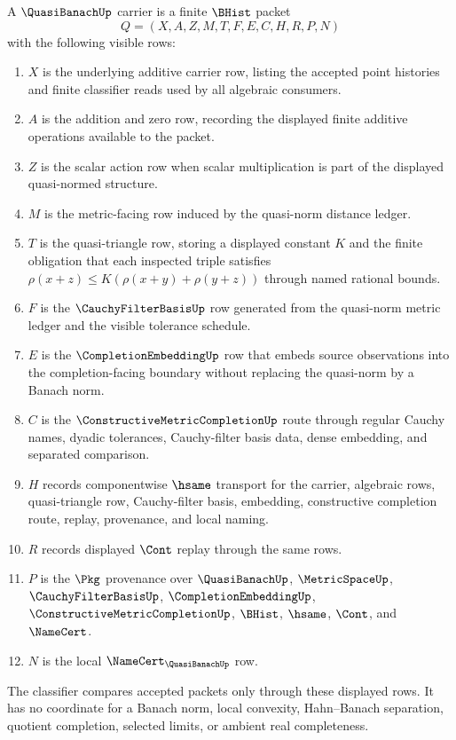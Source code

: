 \begin{definition}
\label{def:quasi-banach-carrier}
A $\QuasiBanachUp$ carrier is a finite $\BHist$ packet
$$
Q=(X,A,Z,M,T,F,E,C,H,R,P,N)
$$
with the following visible rows:
\begin{enumerate}
\item $X$ is the underlying additive carrier row, listing the accepted point histories and finite classifier reads used by all algebraic consumers.
\item $A$ is the addition and zero row, recording the displayed finite additive operations available to the packet.
\item $Z$ is the scalar action row when scalar multiplication is part of the displayed quasi-normed structure.
\item $M$ is the metric-facing row induced by the quasi-norm distance ledger.
\item $T$ is the quasi-triangle row, storing a displayed constant $K$ and the finite obligation that each inspected triple satisfies $\rho(x+z)\leq K(\rho(x+y)+\rho(y+z))$ through named rational bounds.
\item $F$ is the $\CauchyFilterBasisUp$ row generated from the quasi-norm metric ledger and the visible tolerance schedule.
\item $E$ is the $\CompletionEmbeddingUp$ row that embeds source observations into the completion-facing boundary without replacing the quasi-norm by a Banach norm.
\item $C$ is the $\ConstructiveMetricCompletionUp$ route through regular Cauchy names, dyadic tolerances, Cauchy-filter basis data, dense embedding, and separated comparison.
\item $H$ records componentwise $\hsame$ transport for the carrier, algebraic rows, quasi-triangle row, Cauchy-filter basis, embedding, constructive completion route, replay, provenance, and local naming.
\item $R$ records displayed $\Cont$ replay through the same rows.
\item $P$ is the $\Pkg$ provenance over $\QuasiBanachUp$, $\MetricSpaceUp$, $\CauchyFilterBasisUp$, $\CompletionEmbeddingUp$, $\ConstructiveMetricCompletionUp$, $\BHist$, $\hsame$, $\Cont$, and $\NameCert$.
\item $N$ is the local $\NameCert_{\QuasiBanachUp}$ row.
\end{enumerate}
The classifier compares accepted packets only through these displayed rows. It has no coordinate for a Banach norm, local convexity, Hahn--Banach separation, quotient completion, selected limits, or ambient real completeness.
\end{definition}

